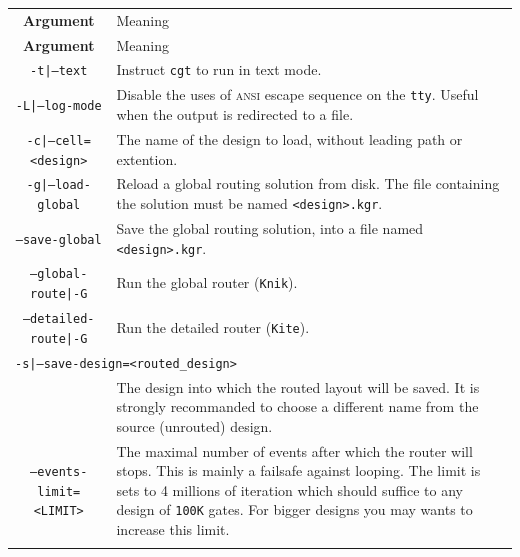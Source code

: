 \documentclass[11pt]{article}
\newcommand {\ANSI}               {\textsc{ansi}\xspace}
\newcommand {\tty}                {\texttt{tty}\xspace}
\newcommand {\Knik}               {\texttt{Knik}\xspace}
\newcommand {\Kite}               {\texttt{Kite}\xspace}
\newcommand {\cgt}                {\texttt{cgt}\xspace}
\begin{document}
  \begin{center}
  \begin{longtable}{|c|p{}|}
      \hline
      \textbf{Argument} & Meaning \\
      \latex{\hline}
      \hline
    \endfirsthead
      \hline
      \textbf{Argument} & Meaning \\
      \latex{\hline}
      \hline
    \endhead
      \hline
    \endfoot
    \endlastfoot
    \latex{\hline}
    \texttt{-t|--text}
      & Instruct \cgt to run in text mode. \\
    \hline
    \texttt{-L|--log-mode}
      & Disable the uses of \ANSI escape sequence on the \tty. Useful when
        the output is redirected to a file. \\
    \hline
    \texttt{-c|--cell=<design>}
      & The name of the design to load, without leading path or
        extention. \\
    \hline
    \texttt{-g|--load-global}
      & Reload a global routing solution from disk. \linebreak
        The file containing the solution must be named \texttt{<design>.kgr}. \\
    \hline
    \texttt{--save-global}
      & Save the global routing solution, into a file named \texttt{<design>.kgr}. \\
    \hline
    \texttt{--global-route|-G}
      & Run the global router (\Knik). \\
    \hline
    \newpage
    \texttt{--detailed-route|-G}
      & Run the detailed router (\Kite). \\
    \hline
    \multicolumn{2}{|l|}{\texttt{-s|--save-design=<routed\_design>}} \\
    \cline{1-1}
      & The design into which the routed layout will be saved. It is strongly
        recommanded to choose a different name from the source (unrouted)
        design. \\
    \hline
    \texttt{--events-limit=<LIMIT>}
      & The maximal number of events after which the router will stops. This is
        mainly a failsafe against looping. The limit is sets to 4 millions of
        iteration which should suffice to any design of \texttt{100K}\xspace
        gates. For bigger designs you may wants to increase this limit. \\
    \latex{\hline}
  \end{longtable}
  \end{center}
\end{document}

